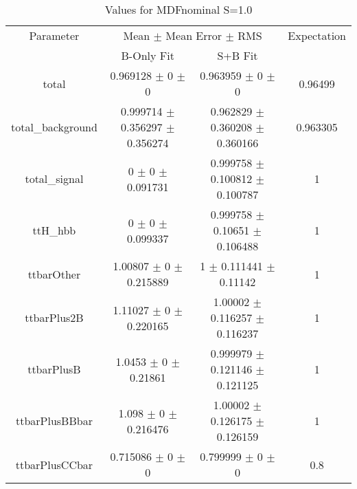 \begin{table}
\centering
\caption{Values for MDFnominal S=1.0}
\begin{tabular}{cccc}
\toprule
Parameter & \multicolumn{2}{c}{Mean $\pm$ Mean Error $\pm$ RMS} & Expectation\\
 & B-Only Fit & S+B Fit & \\
\midrule
total & \num{0.969128} $\pm$ \num{0} $\pm$ \num{0} & \num{0.963959} $\pm$ \num{0} $\pm$ \num{0} & \num{0.96499}\\
total\_background & \num{0.999714} $\pm$ \num{0.356297} $\pm$ \num{0.356274} & \num{0.962829} $\pm$ \num{0.360208} $\pm$ \num{0.360166} & \num{0.963305}\\
total\_signal & \num{0} $\pm$ \num{0} $\pm$ \num{0.091731} & \num{0.999758} $\pm$ \num{0.100812} $\pm$ \num{0.100787} & \num{1}\\
ttH\_hbb & \num{0} $\pm$ \num{0} $\pm$ \num{0.099337} & \num{0.999758} $\pm$ \num{0.10651} $\pm$ \num{0.106488} & \num{1}\\
ttbarOther & \num{1.00807} $\pm$ \num{0} $\pm$ \num{0.215889} & \num{1} $\pm$ \num{0.111441} $\pm$ \num{0.11142} & \num{1}\\
ttbarPlus2B & \num{1.11027} $\pm$ \num{0} $\pm$ \num{0.220165} & \num{1.00002} $\pm$ \num{0.116257} $\pm$ \num{0.116237} & \num{1}\\
ttbarPlusB & \num{1.0453} $\pm$ \num{0} $\pm$ \num{0.21861} & \num{0.999979} $\pm$ \num{0.121146} $\pm$ \num{0.121125} & \num{1}\\
ttbarPlusBBbar & \num{1.098} $\pm$ \num{0} $\pm$ \num{0.216476} & \num{1.00002} $\pm$ \num{0.126175} $\pm$ \num{0.126159} & \num{1}\\
ttbarPlusCCbar & \num{0.715086} $\pm$ \num{0} $\pm$ \num{0} & \num{0.799999} $\pm$ \num{0} $\pm$ \num{0} & \num{0.8}\\
\bottomrule
\end{tabular}
\end{table}